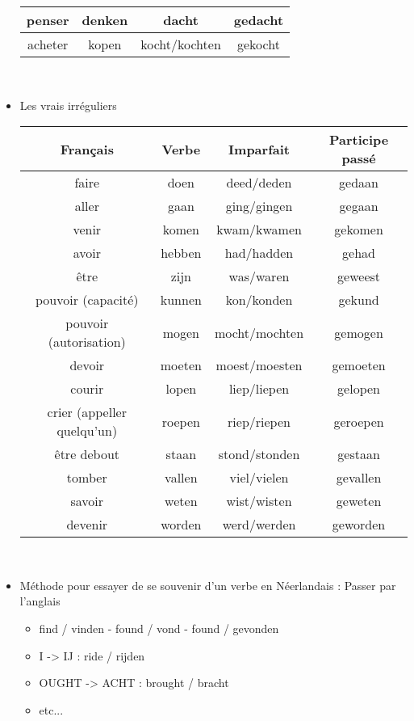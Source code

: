 \documentclass[a4paper]{article}
\begin{document}
\begin{itemize}[label=\textbullet, font=\Large]
\begin{center}
\begin{tabular}{|c|c|c|c|}
      \hline
      penser & denken & dacht & gedacht\\
      \hline
      acheter & kopen & kocht/kochten & gekocht\\
      \hline
    \end{tabular}\\
  \end{center}
  \item Les vrais irréguliers
  \begin{center}
    \begin{tabular}{|c|c|c|c|}
      \hline
      \textbf{Français} & \textbf{Verbe} & \textbf{Imparfait} & \textbf{Participe passé}\\
      \hline
      faire & doen & deed/deden & gedaan\\
      \hline
      aller & gaan & ging/gingen & gegaan\\
      \hline
      venir & komen & kwam/kwamen & gekomen\\
      \hline
      avoir & hebben & had/hadden & gehad\\
      \hline
      être & zijn & was/waren & geweest\\
      \hline
      pouvoir (capacité) & kunnen & kon/konden & gekund\\
      \hline
      pouvoir (autorisation) & mogen &  mocht/mochten & gemogen\\
      \hline
      devoir & moeten & moest/moesten & gemoeten\\
      \hline
      courir & lopen & liep/liepen & gelopen\\
      \hline
      crier (appeller quelqu'un)& roepen & riep/riepen & geroepen\\
      \hline
      être debout & staan & stond/stonden & gestaan\\
      \hline
      tomber & vallen & viel/vielen & gevallen\\
      \hline
      savoir & weten & wist/wisten & geweten\\
      \hline
      devenir & worden &  werd/werden & geworden\\
      \hline
    \end{tabular}\\
  \end{center}
  \item Méthode pour essayer de se souvenir d'un verbe en Néerlandais : Passer par l'anglais
  \begin{itemize}
    \item find / vinden - found / vond - found / gevonden
    \item I -> IJ : ride / rijden
    \item OUGHT -> ACHT : brought / bracht
    \item etc...
  \end{itemize}
\end{itemize}
\end{document}
